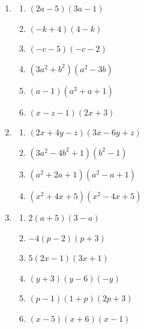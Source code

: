 \begin{ueb}
\begin{enumerate}
        \item
              \begin{enumerate}
                  \item \((2a-5)(3a-1)\)
                  \item \((-k+4)(4-k)\)
                  \item \((-c-5)(-c-2)\)
                  \item \((3a^2+b^2)(a^2-3b)\)
                  \item \((a-1)(a^2+a+1)\)
                  \item \((x-z-1)(2x+3)\)
              \end{enumerate}

        \item
              \begin{enumerate}
                  \item \((2x+4y-z)(3x-6y+z)\)
                  \item \((3a^2-4b^2+1)(b^2-1)\)
                  \item \((a^2+2a+1)(a^2-a+1)\)
                  \item \((x^2+4x+5)(x^2-4x+5)\)
              \end{enumerate}

        \item
              \begin{enumerate}
                  \item \(2(a+5)(3-a)\)
                  \item \(-4(p-2)(p+3)\)
                  \item \(5(2x-1)(3x+1)\)
                  \item \((y+3)(y-6)(-y)\)
                  \item \((p-1)(1+p)(2p+3)\)
                  \item \((x-5)(x+6)(x-1)\)
              \end{enumerate}


\end{enumerate}
\end{ueb}
